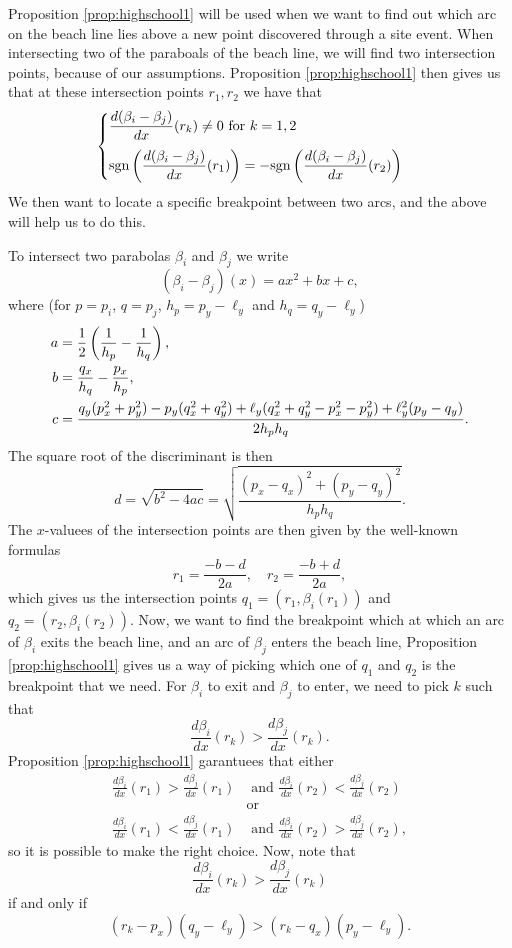 Proposition \ref{prop:highschool1} will be used when we want to find out which arc on the beach line lies above a new point discovered through a site event. When intersecting two of the paraboals of the beach line, we will find two intersection points, because of our assumptions. Proposition \ref{prop:highschool1} then gives us that at these intersection points $r_1, r_2$ we have that
\[
    \begin{cases}
        \displaystyle\frac{d(\beta_i - \beta_j)}{dx}(r_k) \ne 0 \text{ for } k = 1, 2 & \text{ }\vspace{0.25cm} \\ \text{sgn} \para{\displaystyle\frac{d(\beta_i - \beta_j)}{dx}(r_1)} = -\text{sgn} \para{\displaystyle\frac{d(\beta_i - \beta_j)}{dx}(r_2)} & \text{ }
    \end{cases}
\]
We then want to locate a specific breakpoint between two arcs, and the above will help us to do this.

To intersect two parabolas $\beta_i$ and $\beta_j$ we write
\[
    (\beta_i - \beta_j)(x) = a x^2 + b x + c,
\]
where (for $p = p_i$, $q = p_j$, $h_p = p_y - \ell_y$ and $h_q = q_y - \ell_y$)
\begin{align*}
    a &= \frac{1}{2} \left(\frac{1}{h_p} - \frac{1}{h_q}\right), \\
    b &= \frac{q_x}{h_q} - \frac{p_x}{h_p}, \\
    c &= \frac{q_y(p_x^2 + p_y^2) - p_y (q_x^2 + q_y^2) + \ell_y (q_x^2 + q_y^2 - p_x^2 - p_y^2) + \ell_y^2 (p_y - q_y)}{2 h_p h_q}.
\end{align*}
The square root of the discriminant is then
\[
    d = \sqrt{b^2 - 4 ac} = \sqrt{\frac{(p_x - q_x)^2 + (p_y - q_y)^2}{h_p h_q}}.
\]
The $x$-valuees of the intersection points are then given by the well-known formulas
\[
    r_1 = \frac{-b - d}{2 a}, \quad
    r_2 = \frac{-b + d}{2 a},
\]
which gives us the intersection points $q_1 = (r_1, \beta_i(r_1))$ and $q_2 = (r_2, \beta_i(r_2))$. Now, we want to find the breakpoint which at which an arc of $\beta_i$ exits the beach line, and an arc of $\beta_j$ enters the beach line, Proposition \ref{prop:highschool1} gives us a way of picking which one of $q_1$ and $q_2$ is the breakpoint that we need. For $\beta_i$ to exit and $\beta_j$ to enter, we need to pick $k$ such that
\[
    \frac{d \beta_i}{dx}(r_k) > \frac{d \beta_j}{dx}(r_k).
\]
Proposition \ref{prop:highschool1} garantuees that either
\begin{align*}
    \frac{d \beta_i}{dx}(r_1) > \frac{d \beta_j}{dx}(r_1) &\text{ and } \frac{d \beta_i}{dx}(r_2) < \frac{d \beta_j}{dx}(r_2) \\
    &\text{or} \\
    \frac{d \beta_i}{dx}(r_1) < \frac{d \beta_j}{dx}(r_1) &\text{ and } \frac{d \beta_i}{dx}(r_2) > \frac{d \beta_j}{dx}(r_2),
\end{align*}
so it is possible to make the right choice. Now, note that
\[
    \frac{d \beta_i}{dx}(r_k) > \frac{d \beta_j}{dx}(r_k)
\]
if and only if
\[
    (r_k - p_x) (q_y - \ell_y) > (r_k - q_x) (p_y - \ell_y).
\]

